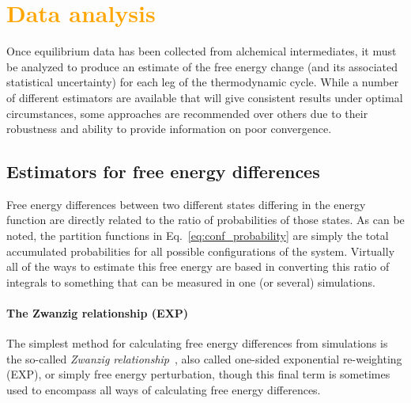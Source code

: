 \documentclass[9pt,bestpractices]{livecoms}
\newcommand{\tocorange}[1]{\textcolor{orange}{#1}}
\begin{document}
\section{\tocorange{Data analysis}}
\label{sec:data_analysis}
Once equilibrium data has been collected from alchemical intermediates, it must be analyzed to produce an estimate of the free energy change (and its associated statistical uncertainty) for each leg of the thermodynamic cycle.
While a number of different estimators are available that will give consistent results under optimal circumstances, some approaches are recommended over others due to their robustness and ability to provide information on poor convergence.

\subsection{Estimators for free energy differences}
\label{subsec:estimators}
Free energy differences between two different states differing in the energy function are directly related to the
ratio of probabilities of those states.
As can be noted, the partition functions in Eq.~\ref{eq:conf_probability} are simply the total accumulated probabilities for all possible configurations of the system. Virtually all of the ways to estimate this free energy are based in converting this ratio of integrals to something that can be measured in one (or several) simulations.  

\paragraph{The Zwanzig relationship (EXP)}
The simplest method for calculating free energy differences from simulations is the so-called \textit{Zwanzig
relationship}~\cite{zwanzig1954hightemperature}, also called one-sided exponential re-weighting (EXP), or simply free energy perturbation, though this final term is sometimes used to encompass all ways of calculating free energy differences.
\end{document}
